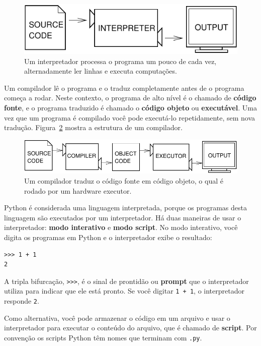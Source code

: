 \documentclass[10pt]{book}
\begin{document}
\begin{figure}
\centerline
{\includegraphics[scale=0.9]{figs/interpret.pdf}}
\caption{Um interpretador processa o programa um pouco de cada vez,
alternadamente ler linhas e executa computações.}
\label{fig.interpret}
\end{figure}

Um compilador lê o programa e o traduz completamente antes de o
programa começa a rodar. Neste contexto, o programa de alto nível é
o chamado de {\bf código fonte}, e o programa traduzido é chamado o
{\bf código objeto} ou {\bf executável}. Uma vez que um programa é
compilado você pode executá-lo repetidamente, sem nova tradução.
Figura~\ref{fig.compile} mostra a estrutura de um compilador.

\begin{figure}
\centerline
{\includegraphics[scale=0.9]{figs/compile.pdf}}
\caption{Um compilador traduz o código fonte em código objeto, o qual é
rodado por um hardware executor.}
\label{fig.compile}
\end{figure}

Python é considerada uma linguagem interpretada, porque os programas desta linguagem
são executados por um interpretador. Há duas maneiras de usar o
interpretador: {\bf modo interativo} e {\bf modo script}. No
modo interativo, você digita os programas em Python e o interpretador exibe
o resultado:

\begin{verbatim}
>>> 1 + 1
2
\end{verbatim}
%
A tripla bifurcação, \verb">>>", é o sinal de prontidão ou
{\bf prompt} que o interpretador utiliza para indicar que ele está pronto. Se
você digitar {\tt 1 + 1}, o interpretador responde {\tt 2}.

Como alternativa, você pode armazenar o código em um arquivo e usar o interpretador para
executar o conteúdo do arquivo, que é chamado de {\bf script}. Por
convenção os scripts Python têm nomes que terminam com {\tt .py}.
\end{document}
